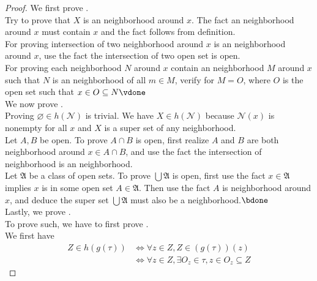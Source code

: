 \documentclass{report}
\begin{document}
\begin{proof}
  We first prove .\\

Try to prove that $X$ is an neighborhood around $x$. The fact an neighborhood around $x$ must contain  $x$ and the fact follows from definition.\\

For proving intersection of two neighborhood around $x$ is an neighborhood around  $x$, use the fact the intersection of two open set is open.\\

For proving each neighborhood $N$ around $x$ contain an neighborhood $M$ around $x$ such that $N$ is an neighborhood of all  $m \in M$, verify for $M=O$, where  $O$ is the open set such that  $x\in O\subseteq N\vdone$\\


We now prove  .\\

Proving $\varnothing \in h(\mathcal{N})$ is trivial. We have $X \in h(\mathcal{N})$ because  $\mathcal{N}(x)$ is nonempty for all $x$ and  $X$ is a super set of any neighborhood.\\

Let $A,B$ be open. To prove $A\cap B$ is open, first realize $A$ and  $B$ are both neighborhood around  $x\in A\cap B$, and use the fact the intersection of neighborhood is an neighborhood.\\

Let $\mathfrak{A}$ be a class of open sets. To prove $\bigcup \mathfrak{A}$ is open, first use the fact $x\in \mathfrak{A}$ implies $x$ is in some open set  $A\in \mathfrak{A}$. Then use the fact $A$ is neighborhood around  $x$, and deduce the super set $\bigcup \mathfrak{A}$ must also be a neighborhood.$\bdone$\\

Lastly, we prove .\\

To prove such, we have to first prove . \\

We first have
\begin{align*}
  Z\in h(g(\tau))&\iff \forall z\in Z, Z\in (g(\tau))(z)\\
      &\iff \forall z\in Z, \exists O_z\in \tau, z\in O_z\subseteq Z 
\end{align*}


\end{proof}
\end{document}
